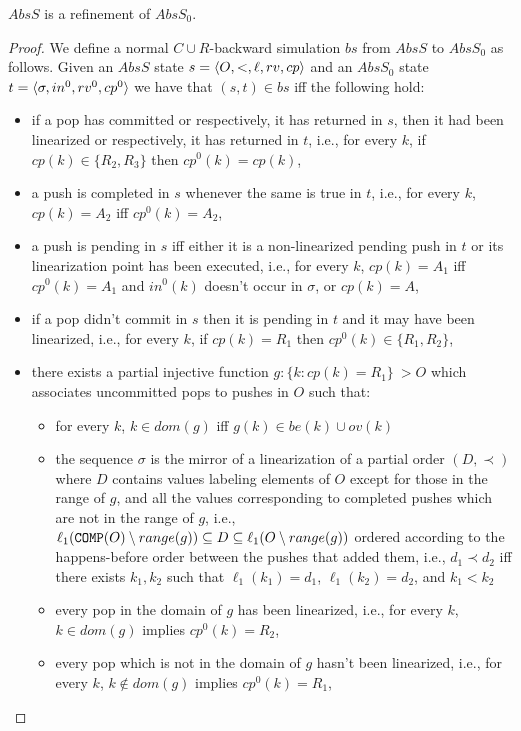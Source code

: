 \begin{lemma} 
$AbsS$ is a refinement of $AbsS_0$.
\end{lemma}
\begin{proof}
We define a normal $C\cup R$-backward simulation $bs$ from $AbsS$ to $AbsS_0$ as follows. Given an $AbsS$ state $s=\langle {O,<,\ell,rv,cp} \rangle$ and an $AbsS_0$ state $t=\langle {\sigma,in^0,rv^0,cp^0} \rangle$ we have that $(s,t)\in bs$ iff the following hold:
\begin{itemize}
	\item if a pop has committed or respectively, it has returned in $s$, then it had been linearized or respectively, it has returned in $t$, i.e., for every $k$, if $cp(k)\in\{R_2,R_3\}$ then $cp^0(k)=cp(k)$,
	\item a push is completed in $s$ whenever the same is true in $t$, i.e., for every $k$, $cp(k)=A_2$ iff $cp^0(k)=A_2$,
	\item a push is pending in $s$ iff either it is a non-linearized pending push in $t$ or its linearization point has been executed, i.e., for every $k$, $cp(k)=A_1$ iff $cp^0(k)=A_1$ and $in^0(k)$ doesn't occur in $\sigma$, or $cp(k)=A$,
	\item if a pop didn't commit in $s$ then it is pending in $t$ and it may have been linearized, i.e., for every $k$, if $cp(k)=R_1$ then $cp^0(k)\in \{R_1,R_2\}$,
	\item there exists a partial injective function $g: \{k: cp(k)=R_1\} ~> O$ which associates uncommitted pops to pushes in $O$ such that:
	\begin{itemize}
		\item for every $k$, $k\in dom(g)$ iff $g(k)\in be(k)\cup ov(k)$
		\item  the sequence $\sigma$ is the mirror of a linearization of a partial order $(D,\prec)$ where $D$ contains values labeling elements of $O$ except for those in the range of $g$, and all the values corresponding to completed pushes which are not in the range of $g$, i.e., $\ell_1({\tt COMP}(O)\setminus range(g))\subseteq D\subseteq \ell_1(O\setminus range(g))$ ordered according to the happens-before order between the pushes that added them, i.e., $d_1\prec d_2$ if{f} there exists $k_1,k_2$ such that $\ell_1(k_1)=d_1$, $\ell_1(k_2)=d_2$, and $k_1 < k_2$
		\item every pop in the domain of $g$ has been linearized, i.e., for every $k$, $k\in dom(g)$ implies $cp^0(k)=R_2$,
		\item every pop which is not in the domain of $g$ hasn't been linearized, i.e., for every $k$, $k\not\in dom(g)$ implies $cp^0(k)=R_1$,

\end{itemize}
\end{itemize}
\end{proof}
